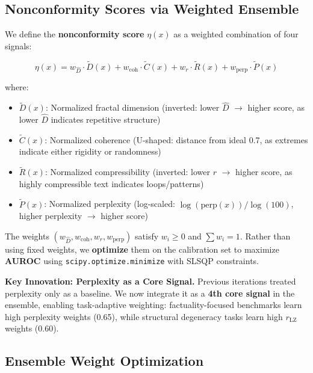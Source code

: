 \documentclass[10pt]{article}
\begin{document}
\subsection{Nonconformity Scores via Weighted Ensemble}
\label{sec:conformal-scores}

We define the \textbf{nonconformity score} $\eta(x)$ as a weighted combination of four signals:

\begin{equation}
\eta(x) = w_{\hat{D}} \cdot \tilde{D}(x) + w_{\text{coh}} \cdot \tilde{C}(x) + w_{r} \cdot \tilde{R}(x) + w_{\text{perp}} \cdot \tilde{P}(x)
\end{equation}

where:
\begin{itemize}
\item $\tilde{D}(x)$: Normalized fractal dimension (inverted: lower $\hat{D}$ $\rightarrow$ higher score, as lower $\hat{D}$ indicates repetitive structure)
\item $\tilde{C}(x)$: Normalized coherence (U-shaped: distance from ideal 0.7, as extremes indicate either rigidity or randomness)
\item $\tilde{R}(x)$: Normalized compressibility (inverted: lower $r$ $\rightarrow$ higher score, as highly compressible text indicates loops/patterns)
\item $\tilde{P}(x)$: Normalized perplexity (log-scaled: $\log(\text{perp}(x)) / \log(100)$, higher perplexity $\rightarrow$ higher score)
\end{itemize}

The weights $(w_{\hat{D}}, w_{\text{coh}}, w_r, w_{\text{perp}})$ satisfy $w_i \ge 0$ and $\sum w_i = 1$. Rather than using fixed weights, we \textbf{optimize} them on the calibration set to maximize \textbf{AUROC} using \texttt{scipy.optimize.minimize} with SLSQP constraints.

\textbf{Key Innovation: Perplexity as a Core Signal.}
Previous iterations treated perplexity only as a baseline. We now integrate it as a \textbf{4th core signal} in the ensemble, enabling task-adaptive weighting: factuality-focused benchmarks learn high perplexity weights (0.65), while structural degeneracy tasks learn high $r_{\text{LZ}}$ weights (0.60).

\subsection{Ensemble Weight Optimization}
\label{sec:conformal-weights}
\end{document}

